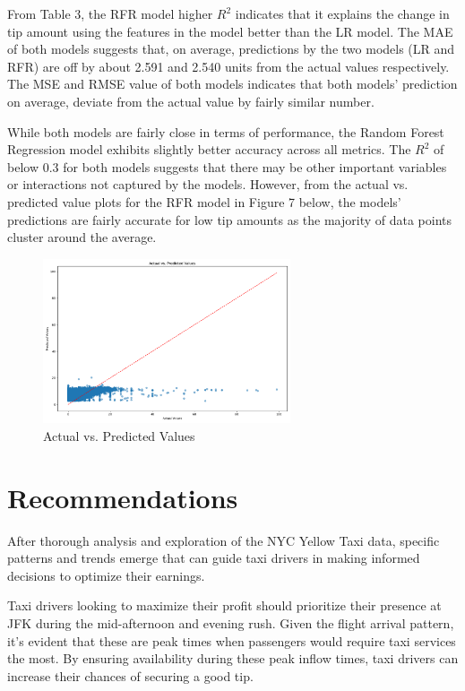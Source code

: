\documentclass[11pt]{article}
\begin{document}
From Table 3, the RFR model higher \( R^2 \) indicates that it explains the change in tip amount using the features in the model better than the LR model. The MAE of both models suggests that, on average, predictions by the two models (LR and RFR) are off by about 2.591 and 2.540 units from the actual values respectively. The MSE and RMSE value of both models indicates that both models' prediction on average, deviate from the actual value by fairly similar number. 

While both models are fairly close in terms of performance, the Random Forest Regression model exhibits slightly better accuracy across all metrics. The \( R^2 \) of below 0.3 for both models suggests that there may be other important variables or interactions not captured by the models. However, from the actual vs. predicted value plots for the RFR model in Figure 7 below, the models' predictions are fairly accurate for low tip amounts as the majority of data points cluster around the average. 

\begin{figure}[h]
    \includegraphics[width=0.65\textwidth]{plots/predicted_vs_actual_RFR.png}
    \centering
    \caption{Actual vs. Predicted Values} 
\end{figure}

\section{Recommendations}
After thorough analysis and exploration of the NYC Yellow Taxi data, specific patterns and trends emerge that can guide taxi drivers in making informed decisions to optimize their earnings. 

Taxi drivers looking to maximize their profit should prioritize their presence at JFK during the mid-afternoon and evening rush. Given the flight arrival pattern, it's evident that these are peak times when passengers would require taxi services the most. By ensuring availability during these peak inflow times, taxi drivers can increase their chances of securing a good tip.
\end{document}
